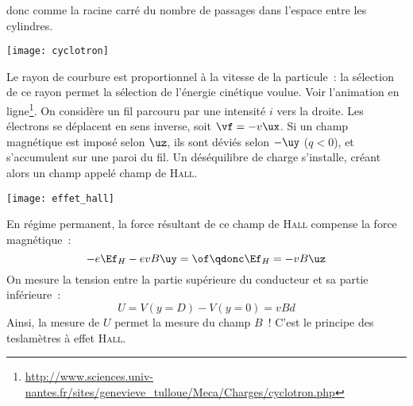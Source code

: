 \documentclass[../main/main.tex]{subfiles}
\begin{document}
\begin{itemize}[label=$\diamond$]
        donc comme la racine carré du nombre de passages dans l'espace entre les
        cylindres.
        \begin{center}
            \texttt{[image: cyclotron]}
            \label{fig:cyclotron}
        \end{center}
        Le rayon de courbure est proportionnel à la vitesse de la particule~: la
        sélection de ce rayon permet la sélection de l'énergie cinétique
        voulue. Voir l'animation en
        ligne\footnote{\url{http://www.sciences.univ-nantes.fr/sites/genevieve_tulloue/Meca/Charges/cyclotron.php}}.
        \bigbreak
     On considère un fil parcouru par une intensité
        $i$ vers la droite. Les électrons se déplacent en sens inverse, soit
        $\vf = -v\ux$. Si un champ magnétique est imposé selon $\uz$, ils sont
        déviés selon $-\uy$ ($q < 0$), et s'accumulent sur une paroi du fil. Un
        déséquilibre de charge s'installe, créant alors un champ appelé champ de
        \textsc{Hall}.
        \begin{center}
            \texttt{[image: effet\_hall]}
            \label{fig:hall}
        \end{center}
        En régime permanent, la force résultant de ce champ de \textsc{Hall}
        compense la force magnétique~:
        \[
            -e\Ef_H -evB\uy = \of
            \qdonc
            \Ef_H = -vB\uz
        \]
        On mesure la tension entre la partie supérieure du conducteur et sa
        partie inférieure~:
        \[U = V(y=D) - V(y=0) = vBd\]
        Ainsi, la mesure de $U$ permet la mesure du champ $B$~! C'est le
        principe des teslamètres à effet \textsc{Hall}.
\end{itemize}
\end{document}
